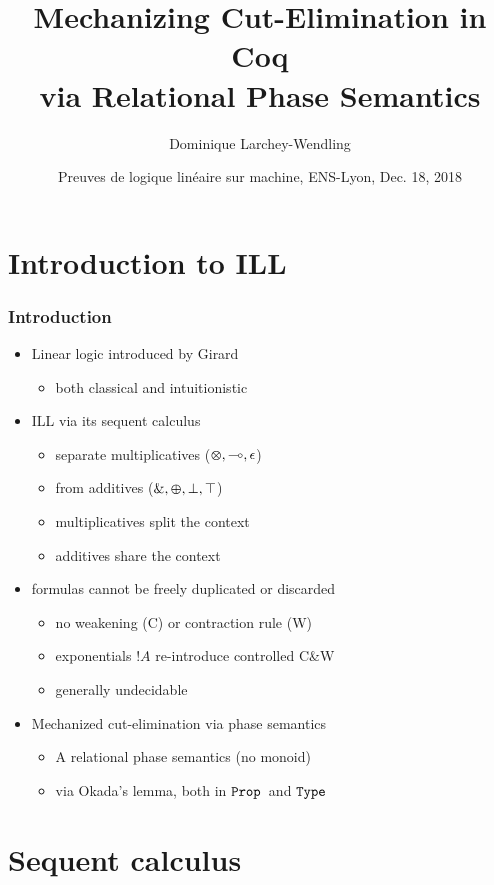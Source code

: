 \documentclass[xcolor=pdftex,graphicx=pdftex,12pt]{beamer}
\title{Mechanizing Cut-Elimination in Coq\\ via Relational Phase Semantics}
\author{Dominique Larchey-Wendling}
\institute{Université de Lorraine, LORIA, CNRS, Nancy, France}
\date{Preuves de logique linéaire sur machine, ENS-Lyon, Dec. 18, 2018}
\newcommand{\coq}[1]{\ensuremath{\mathalpha{\mathtt{#1}}}}
\newcommand{\Prop}{\coq{Prop}}
\newcommand{\Type}{\coq{Type}}
\newcommand{\lwith}{\mathbin{\text{\upshape \&}}}
\newcommand{\lplus}{\mathbin{\varoplus}}
\newcommand{\ltime}{\mathbin{\varotimes}}
\newcommand{\lunit}{\mathalpha{\epsilon}}
\newcommand{\limp}{\mathbin{\multimap}}
\newcommand{\ltop}{\mathalpha{\top}}
\newcommand{\lbot}{\mathalpha{\bot}}
\newcommand{\lbang}{\mathop{!}}
\begin{document}
\begin{frame}\titlepage\end{frame}

\section{Introduction to ILL}

\begin{frame}

\frametitle{Introduction}

\begin{itemize}
\item Linear logic introduced by Girard
  \begin{itemize}
  \item both classical and intuitionistic
  \end{itemize}
\item ILL via its sequent calculus
  \begin{itemize}
  \item separate multiplicatives (${\ltime},{\limp},{\lunit}$)
  \item from additives (${\lwith},{\lplus},\lbot, \ltop$)
  \item multiplicatives split the context
  \item additives share the context
  \end{itemize}
\item formulas cannot be freely duplicated or discarded
  \begin{itemize}
  \item no weakening (C) or contraction rule (W)
  \item exponentials $\lbang A$ re-introduce controlled C\&W
  \item generally undecidable
  \end{itemize}
\item Mechanized cut-elimination via phase semantics
  \begin{itemize}
  \item A relational phase semantics (no monoid)
  \item via Okada's lemma, both in \Prop\ and \Type
  \end{itemize}
\end{itemize}

\end{frame}

\section{Sequent calculus}
\end{document}
